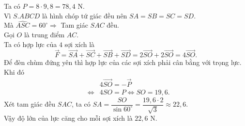 \begin{bt}
{\begin{center}
		\end{center}
		Ta  có $P=8\cdot 9{,}8=78{,}4$ N.\\
		Vì $S.ABCD$ là hình chóp tứ giác đều nên  $SA=SB=SC=SD$.\\
		Mà  $\widehat{ASC}=60^{\circ} \Rightarrow$ Tam giác $SAC$ đều.\\
		 Gọi $O$ là trung điểm $AC$.\\
		Ta có hợp lực của  $4$ sợi xích là $$\overrightarrow{F}=\overrightarrow{SA}+\overrightarrow{SC}+\overrightarrow{SB}+\overrightarrow{SD}=2\overrightarrow{SO}+2\overrightarrow{SO}=4\overrightarrow{SO}.$$
		Để  đèn chùm đứng yên thì hợp lực của các sợi xích phải cân bằng với trọng lực. Khi đó
		\begin{eqnarray*}
			 & &4\overrightarrow{SO}=-\overrightarrow{P}\\
			&\Leftrightarrow&4SO=P\Leftrightarrow SO=19{,}6. 
		\end{eqnarray*}
		Xét tam giác đều $SAC$, ta  có $SA=\dfrac{SO}{\sin 60^\circ} = \dfrac{19{,}6 \cdot 2}{\sqrt{3}} \approx 22{,}6$.\\
		Vậy độ lớn của lực căng cho mỗi sợi xích là  $22{,}6$ N.
	} 
\end{bt}

